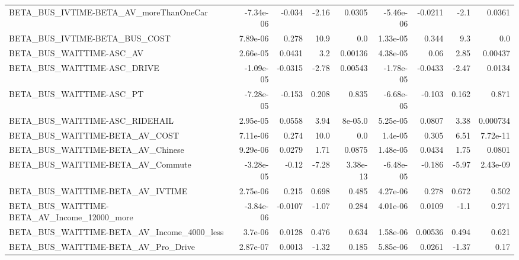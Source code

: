 \begin{tabular}{lrrrrrrrr}
BETA\_BUS\_IVTIME-BETA\_AV\_moreThanOneCar             &   -7.34e-06 &       -0.034 &     -2.16 &   0.0305 &  -5.46e-06 &     -0.0211 &         -2.1 &        0.0361 \\
BETA\_BUS\_IVTIME-BETA\_BUS\_COST                      &    7.89e-06 &        0.278 &      10.9 &      0.0 &   1.33e-05 &       0.344 &          9.3 &           0.0 \\
BETA\_BUS\_WAITTIME-ASC\_AV                           &    2.66e-05 &       0.0431 &       3.2 &  0.00136 &   4.38e-05 &        0.06 &         2.85 &       0.00437 \\
BETA\_BUS\_WAITTIME-ASC\_DRIVE                        &   -1.09e-05 &      -0.0315 &     -2.78 &  0.00543 &  -1.78e-05 &     -0.0433 &        -2.47 &        0.0134 \\
BETA\_BUS\_WAITTIME-ASC\_PT                           &   -7.28e-05 &       -0.153 &     0.208 &    0.835 &  -6.68e-05 &      -0.103 &        0.162 &         0.871 \\
BETA\_BUS\_WAITTIME-ASC\_RIDEHAIL                     &    2.95e-05 &       0.0558 &      3.94 &  8e-05.0 &   5.25e-05 &      0.0807 &         3.38 &      0.000734 \\
BETA\_BUS\_WAITTIME-BETA\_AV\_COST                     &    7.11e-06 &        0.274 &      10.0 &      0.0 &    1.4e-05 &       0.305 &         6.51 &      7.72e-11 \\
BETA\_BUS\_WAITTIME-BETA\_AV\_Chinese                  &    9.29e-06 &       0.0279 &      1.71 &   0.0875 &   1.48e-05 &      0.0434 &         1.75 &        0.0801 \\
BETA\_BUS\_WAITTIME-BETA\_AV\_Commute                  &   -3.28e-05 &        -0.12 &     -7.28 & 3.38e-13 &  -6.48e-05 &      -0.186 &        -5.97 &      2.43e-09 \\
BETA\_BUS\_WAITTIME-BETA\_AV\_IVTIME                   &    2.75e-06 &        0.215 &     0.698 &    0.485 &   4.27e-06 &       0.278 &        0.672 &         0.502 \\
BETA\_BUS\_WAITTIME-BETA\_AV\_Income\_12000\_more        &   -3.84e-06 &      -0.0107 &     -1.07 &    0.284 &   4.01e-06 &      0.0109 &         -1.1 &         0.271 \\
BETA\_BUS\_WAITTIME-BETA\_AV\_Income\_4000\_less         &     3.7e-06 &       0.0128 &     0.476 &    0.634 &   1.58e-06 &     0.00536 &        0.494 &         0.621 \\
BETA\_BUS\_WAITTIME-BETA\_AV\_Pro\_Drive                &    2.87e-07 &       0.0013 &     -1.32 &    0.185 &   5.85e-06 &      0.0261 &        -1.37 &          0.17 \\

\end{tabular}
